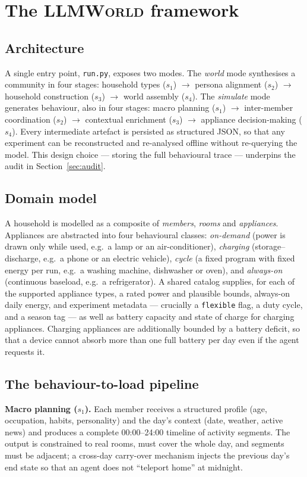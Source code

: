 \documentclass[11pt]{article}
\begin{document}
\section{The \textsc{LLMWorld} framework}

\subsection{Architecture}
A single entry point, \texttt{run.py}, exposes two modes. The \emph{world} mode synthesises a community
in four stages: household types ($s_1$) $\rightarrow$ persona alignment ($s_2$) $\rightarrow$ household
construction ($s_3$) $\rightarrow$ world assembly ($s_4$). The \emph{simulate} mode generates behaviour,
also in four stages: macro planning ($s_1$) $\rightarrow$ inter-member coordination ($s_2$) $\rightarrow$
contextual enrichment ($s_3$) $\rightarrow$ appliance decision-making ($s_4$). Every intermediate artefact
is persisted as structured JSON, so that any experiment can be reconstructed and re-analysed offline
without re-querying the model. This design choice --- storing the full behavioural trace --- underpins the
audit in Section~\ref{sec:audit}.

\subsection{Domain model}
A household is modelled as a composite of \emph{members}, \emph{rooms} and \emph{appliances}. Appliances
are abstracted into four behavioural classes: \emph{on-demand} (power is drawn only while used, e.g.\ a
lamp or an air-conditioner), \emph{charging} (storage--discharge, e.g.\ a phone or an electric vehicle),
\emph{cycle} (a fixed program with fixed energy per run, e.g.\ a washing machine, dishwasher or oven), and
\emph{always-on} (continuous baseload, e.g.\ a refrigerator). A shared catalog supplies, for each of the
supported appliance types, a rated power and plausible bounds, always-on daily energy, and experiment
metadata --- crucially a \texttt{flexible} flag, a duty cycle, and a season tag --- as well as battery
capacity and state of charge for charging appliances. Charging appliances are additionally bounded by a
battery deficit, so that a device cannot absorb more than one full battery per day even if the agent
requests it.

\subsection{The behaviour-to-load pipeline}
\textbf{Macro planning ($s_1$).} Each member receives a structured profile (age, occupation, habits,
personality) and the day's context (date, weather, active news) and produces a complete 00:00--24:00
timeline of activity segments. The output is constrained to real rooms, must cover the whole day, and
segments must be adjacent; a cross-day carry-over mechanism injects the previous day's end state so that
an agent does not ``teleport home'' at midnight.
\end{document}
